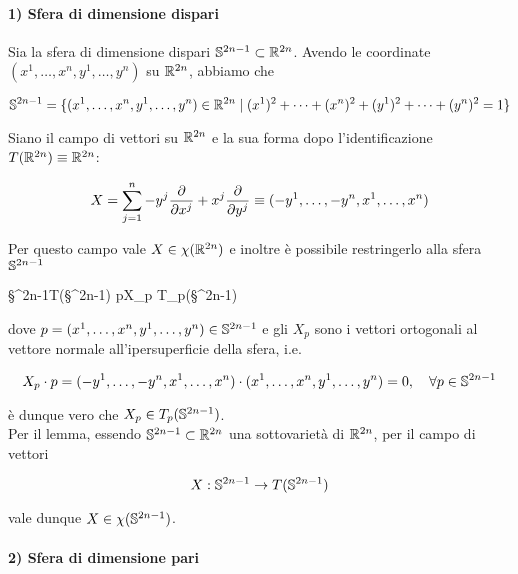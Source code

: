 \paragraph{1) Sfera di dimensione dispari}

Sia la sfera di dimensione dispari $ \S^{2n-1} \subset \R^{2n} $. Avendo le coordinate $ (x^{1},\dots,x^{n},y^{1},\dots,y^{n}) $ su $ \R^{2n} $, abbiamo che

\begin{equation}
	\S^{2n-1} = \{ (x^{1},\dots,x^{n},y^{1},\dots,y^{n}) \in \R^{2n} \mid (x^{1})^{2} + \cdots + (x^{n})^{2} + (y^{1})^{2} + \cdots + (y^{n})^{2} = 1 \}
\end{equation}

Siano il campo di vettori su $ \R^{2n} $ e la sua forma dopo l'identificazione $ T(\R^{2n}) \equiv \R^{2n} $:

\begin{equation}
	X = \sum_{j=1}^{n} - y^{j} \pdv{x^{j}} + x^{j} \pdv{y^{j}} %
	\equiv (-y^{1},\dots,-y^{n},x^{1},\dots,x^{n})
\end{equation}

Per questo campo vale $ X \in \chi(\R^{2n}) $ e inoltre è possibile restringerlo alla sfera $ \S^{2n-1} $

	{\S^{2n-1}}{T(\S^{2n-1})}
	{p}{X_{p} \in T_{p}(\S^{2n-1})}

dove $ p = (x^{1},\dots,x^{n},y^{1},\dots,y^{n}) \in \S^{2n-1} $ e gli $ X_{p} $ sono i vettori ortogonali al vettore normale all'ipersuperficie della sfera, i.e.

\begin{equation}
	X_{p} \cdot p = (-y^{1},\dots,-y^{n},x^{1},\dots,x^{n}) \cdot (x^{1},\dots,x^{n},y^{1},\dots,y^{n}) = 0 %
	\qcomma \forall p \in \S^{2n-1}
\end{equation}

è dunque vero che $ X_{p} \in T_{p}(\S^{2n-1}) $. \\
Per il lemma, essendo $ \S^{2n-1} \subset \R^{2n} $ una sottovarietà di $ \R^{2n} $, per il campo di vettori

\begin{equation}
	X : \S^{2n-1} \to T(\S^{2n-1})
\end{equation}

vale dunque $ X \in \chi(\S^{2n-1}) $.

\paragraph{2) Sfera di dimensione pari}

